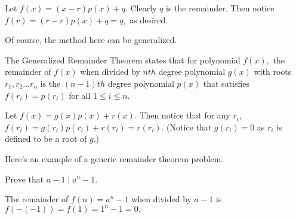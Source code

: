 \documentclass[mast]{lucky}
\begin{document}
\begin{pro}
Let $f(x)=(x-r)p(x)+q.$ Clearly $q$ is the remainder. Then notice $f(r)=(r-r)p(x)+q=q,$ as desired.
\end{pro}

Of course, the method here can be generalized.
\begin{theo}
The Generalized Remainder Theorem states that for polynomial $f(x),$ the remainder of $f(x)$ when divided by $nth$ degree polynomial $g(x)$ with roots $r_1,r_2\dots r_n$ is the $(n-1)th$ degree polynomial $p(x)$ that satisfies $f(r_i)=p(r_i)$ for all $1\leq i\leq n.$
\end{theo}

\begin{pro}
Let $f(x)=g(x)p(x)+r(x).$ Then notice that for any $r_i,$ $f(r_i)=g(r_i)p(r_i)+r(r_i)=r(r_i).$ (Notice that $g(r_i)=0$ as $r_i$ is defined to be a root of $g.$)
\end{pro}

Here's an example of a generic remainder theorem problem.

\begin{exam}
Prove that $a-1\mid a^n-1.$
\end{exam}

\begin{sol}
The remainder of $f(n)=a^n-1$ when divided by $a-1$ is $f(-(-1))=f(1)=1^n-1=0.$
\end{sol}

%
%
\end{document}
